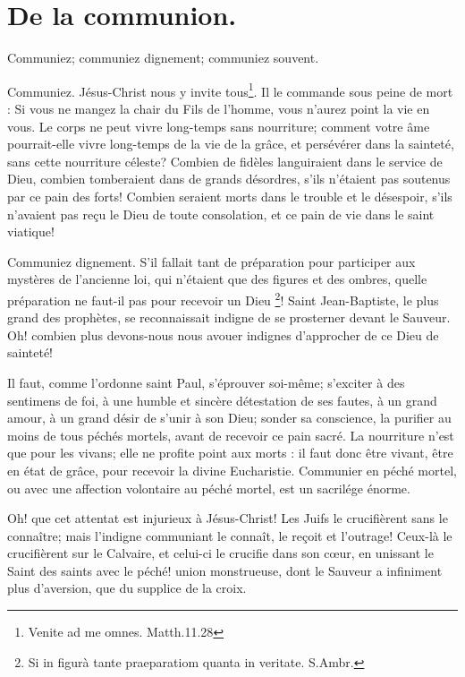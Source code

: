 \documentclass[instructions.tex]{subfiles}
\begin{document}
 
\chapter{De la communion.}
 
Communiez; communiez dignement; communiez souvent.
 
\primo Communiez. Jésus-Christ nous y invite tous\footnote{Venite ad me omnes. Matth.11.28}. Il le commande sous peine de mort : Si vous ne mangez la chair du Fils de l’homme, vous n’aurez point la vie en vous. Le corps ne peut vivre long-temps sans nourriture; comment votre âme pourrait-elle vivre long-temps de la vie de la grâce, et persévérer dans la sainteté, sans cette nourriture céleste? Combien de fidèles languiraient dans le service de Dieu, combien tomberaient dans de grands désordres, s’ils n’étaient pas soutenus par ce pain des forts! Combien seraient morts dans le trouble et le désespoir, s’ils n’avaient pas reçu le Dieu de toute consolation, et ce pain de vie dans le saint viatique!
 
\secundo Communiez dignement. S’il fallait tant de préparation pour participer aux mystères de l’ancienne loi, qui n’étaient que des figures et des ombres, quelle préparation ne faut-il pas pour recevoir un Dieu \footnote{Si in figurà tante praeparatiom quanta in veritate. S.Ambr.}! Saint Jean-Baptiste, le plus grand des prophètes, se reconnaissait indigne de se prosterner devant le Sauveur. Oh! combien plus devons-nous nous avouer indignes d’approcher de ce Dieu de sainteté!
 
Il faut, comme l’ordonne saint Paul, s’éprouver soi-même; s’exciter à des sentimens de foi, à une humble et sincère détestation de ses fautes, à un grand amour, à un grand désir de s’unir à son Dieu; sonder sa conscience, la purifier au moins de tous péchés mortels, avant de recevoir ce pain sacré. La nourriture n’est que pour les vivans; elle ne profite point aux morts : il faut donc être vivant, être en état de grâce, pour recevoir la divine Eucharistie. Communier en péché mortel, ou avec une affection volontaire au péché mortel, est un sacrilége énorme.
 
Oh! que cet attentat est injurieux à Jésus-Christ! Les Juifs le crucifièrent sans le connaître; mais l’indigne communiant le connaît, le reçoit et l’outrage! Ceux-là le crucifièrent sur le Calvaire, et celui-ci le crucifie dans son cœur, en unissant le Saint des saints avec le péché! union monstrueuse, dont le Sauveur a infiniment plus d’aversion, que du supplice de la croix.
 
\end{document}
